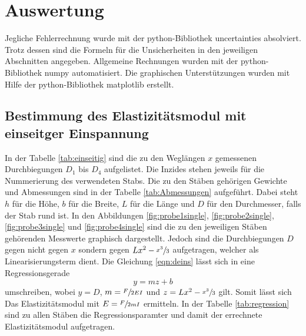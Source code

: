 \section{Auswertung}
\label{sec:Auswertung}
Jegliche Fehlerrechnung wurde mit der python-Bibliothek uncertainties \cite{uncertainties} absolviert.
Trotz dessen sind die Formeln für die Unsicherheiten in den jeweiligen Abschnitten angegeben.
Allgemeine Rechnungen wurden mit der python-Bibliothek numpy \cite{numpy} automatisiert. 
Die graphischen Unterstützungen wurden mit Hilfe der python-Bibliothek matplotlib \cite{matplotlib} erstellt.\\
\subsection{Bestimmung des Elastizitätsmodul mit einseitger Einspannung} \label{sec:einseitig}
In der Tabelle \ref{tab:einseitig} sind die zu den Weglängen $x$ gemessenen Durchbiegungen $D_1$ bis $D_4$ aufgelistet.
Die Inzides stehen jeweils für die Nummerierung des verwendeten Stabs.
Die zu den Stäben gehörigen Gewichte und Abmessungen sind in der Tabelle \ref{tab:Abmessungen} aufgeführt. 
Dabei steht $h$ für die Höhe, $b$ für die Breite, $L$ für die Länge und $D$ für den Durchmesser, falls der Stab rund ist.
In den Abbildungen \ref{fig:probe1single}, \ref{fig:probe2single}, \ref{fig:probe3single} und \ref{fig:probe4single} sind die 
zu den jeweiligen Stäben gehörenden Messwerte graphisch dargestellt. 
Jedoch sind die Durchbiegungen $D$ gegen nicht gegen $x$ sondern gegen $Lx^2 - \sfrac{x^3}{3}$ aufgetragen, welcher als Linearisierungsterm dient.
Die Gleichung \eqref{eqn:deins} lässt sich in eine Regressionsgerade 
\begin{equation}
  y = m  z + b 
\end{equation}
umschreiben, wobei $y = D$, $m=\sfrac{F}{2EI}$ und $z = Lx^2 - \sfrac{x^3}{3}$ gilt.
Somit lässt sich Das Elastizitätsmodul mit $E = \sfrac{F}{2mI}$ ermitteln.
In der Tabelle \ref{tab:regression} sind zu allen Stäben die Regressionsparamter und damit der errechnete Elastizitätsmodul aufgetragen.
